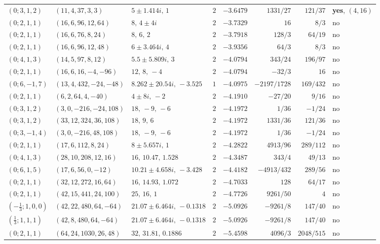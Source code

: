 \documentclass[11pt,reqno]{amsart}
\theoremstyle{plain}
\theoremstyle{definition}
\theoremstyle{remark}
\theoremstyle{plain}
\begin{document}
\begin{table}[htbp]
\begin{tabular}{llllrrrl}
$(0;3,1,2)$ & $(11,4,37,3,3)$ & $5\pm1.414i,\,1$ & $2$ & $-3.6479$ & $1331/27$ & $121/37$ & \textbf{yes}, $(4,16)$\\
$(0;2,1,1)$ & $(16,6,96,12,64)$ & $8,\,4\pm4i$ & $2$ & $-3.7329$ & $16$ & $8/3$ & no\\
$(0;2,1,1)$ & $(16,6,76,8,24)$ & $8,\,6,\,2$ & $2$ & $-3.7918$ & $128/3$ & $64/19$ & no\\
$(0;2,1,1)$ & $(16,6,96,12,48)$ & $6\pm3.464i,\,4$ & $2$ & $-3.9356$ & $64/3$ & $8/3$ & no\\
$(0;4,1,3)$ & $(14,5,97,8,12)$ & $5.5\pm5.809i,\,3$ & $2$ & $-4.0794$ & $343/24$ & $196/97$ & no\\
$(0;2,1,1)$ & $(16,6,16,-4,-96)$ & $12,\,8,\,-4$ & $2$ & $-4.0794$ & $-32/3$ & $16$ & no\\
$(0;6,-1,7)$ & $(13,4,432,-24,-48)$ & $8.262\pm20.54i,\,-3.525$ & $1$ & $-4.0975$ & $-2197/1728$ & $169/432$ & no\\
$(0;2,1,1)$ & $(6,2,64,4,-40)$ & $4\pm8i,\,-2$ & $2$ & $-4.1910$ & $-27/20$ & $9/16$ & no\\
$(0;3,1,2)$ & $(3,0,-216,-24,108)$ & $18,\,-9,\,-6$ & $2$ & $-4.1972$ & $1/36$ & $-1/24$ & no\\
$(0;3,1,2)$ & $(33,12,324,36,108)$ & $18,\,9,\,6$ & $2$ & $-4.1972$ & $1331/36$ & $121/36$ & no\\
$(0;3,-1,4)$ & $(3,0,-216,48,108)$ & $18,\,-9,\,-6$ & $2$ & $-4.1972$ & $1/36$ & $-1/24$ & no\\
$(0;2,1,1)$ & $(17,6,112,8,24)$ & $8\pm5.657i,\,1$ & $2$ & $-4.2822$ & $4913/96$ & $289/112$ & no\\
$(0;4,1,3)$ & $(28,10,208,12,16)$ & $16,\,10.47,\,1.528$ & $2$ & $-4.3487$ & $343/4$ & $49/13$ & no\\
$(0;6,1,5)$ & $(17,6,56,0,-12)$ & $10.21\pm4.658i,\,-3.428$ & $2$ & $-4.4182$ & $-4913/432$ & $289/56$ & no\\
$(0;2,1,1)$ & $(32,12,272,16,64)$ & $16,\,14.93,\,1.072$ & $2$ & $-4.7033$ & $128$ & $64/17$ & no\\
$(0;2,1,1)$ & $(42,15,441,24,100)$ & $25,\,16,\,1$ & $2$ & $-4.7726$ & $9261/50$ & $4$ & no\\
$(-\tfrac13;1,0,0)$ & $(42,22,480,64,-64)$ & $21.07\pm6.464i,\,-0.1318$ & $2$ & $-5.0926$ & $-9261/8$ & $147/40$ & no\\
$(\tfrac13;1,1,1)$ & $(42,8,480,64,-64)$ & $21.07\pm6.464i,\,-0.1318$ & $2$ & $-5.0926$ & $-9261/8$ & $147/40$ & no\\
$(0;2,1,1)$ & $(64,24,1030,26,48)$ & $32,\,31.81,\,0.1886$ & $2$ & $-5.4598$ & $4096/3$ & $2048/515$ & no\\
\bottomrule
\end{tabular}
\end{table}
\end{document}
